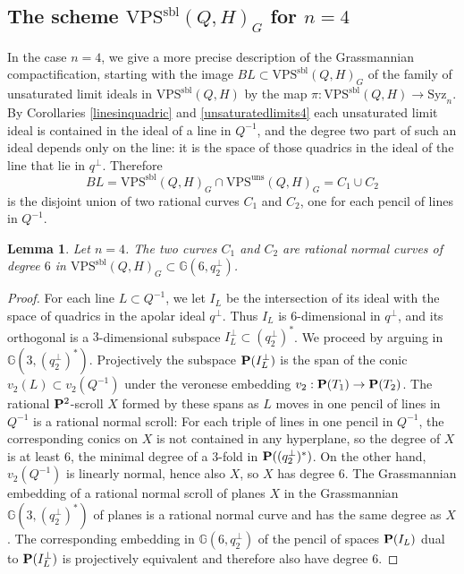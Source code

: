 \documentclass{amsart}
\newcommand{\PP}{{\bf P}}
\def\Gr #1#2{{\mathbb G}\left(#1,#2\right)} %
\newcommand{\VPSsbl}{{\mathrm{VPS}}^{\mathrm{sbl}}(Q, H)}
\newcommand{\VPSuns}{{\mathrm{VPS}}^{\mathrm{uns}}(Q, H)}
\newcommand{\Syz}{\mathrm{Syz}_n}%
\newtheorem{lemma}{\bf Lemma}[section]
\begin{document}
\subsection{The scheme $\VPSsbl_G$ for $n=4$}
In the case $n=4$, we give a more precise description of the Grassmannian
compactification, starting with the image $BL\subset \VPSsbl_G$
of the family of unsaturated limit ideals in $\VPSsbl$ by the map
$\pi:\VPSsbl\to \Syz$. By Corollaries \ref{linesinquadric} and
\ref{unsaturatedlimits4} each unsaturated limit ideal is contained in the
ideal of a line in $Q^{-1}$, and the degree two part of such an ideal depends
only on the line: it is the space of those quadrics in the ideal of the line that lie in $q^\perp$. Therefore $$BL=\VPSsbl_G\cap\VPSuns_G=C_1\cup C_2$$ is the disjoint union of two rational curves $C_1$ and $C_2$, one for each pencil of lines in $Q^{-1}$.

\begin{lemma}\label{degree6lem} Let $n=4$. The two curves $C_1$ and $C_2$ are rational normal curves of degree $6$ in 
$\VPSsbl_G\subset \Gr{6}{q^\perp_2}$.
\end{lemma}
\begin{proof} For each line $L\subset Q^{-1}$, we let $I_L$ be the intersection of its ideal with the space of quadrics in the apolar ideal $q^\perp$.  
Thus $I_L$ is $6$-dimensional in $q^\perp$, and its orthogonal is a $3$-dimensional subspace $I_L^\perp\subset (q^\perp_2)^*$.
We proceed by arguing in $\Gr{3}{(q^\perp_2)^*}$.  Projectively  the subspace $\PP(I_L^\perp)$ is the span of the conic  $v_2(L)\subset v_2(Q^{-1})$ under the veronese embedding $v_2: \PP(T_1)\to \PP(T_2)$. The rational $\PP^2$-scroll $X$ formed by these spans as $L$ moves in one pencil of lines in $Q^{-1}$ is a rational normal scroll: For each triple of lines in one pencil in $Q^{-1}$, the corresponding conics on $X$ is not contained in any hyperplane, so the degree of $X$ is at least $6$, the minimal degree of a $3$-fold in $\PP((q^\perp_2)^*)$.  On the other hand, $v_2(Q^{-1})$ is linearly normal, hence also $X$, so $X$ has degree $6$.  The Grassmannian embedding of a rational normal scroll of planes $X$ in the Grassmannian $\Gr{3}{(q^\perp_2)^*}$ of planes is a rational normal curve and has the same degree as $X$.  The corresponding embedding in $\Gr{6}{q^\perp_2}$ of the  pencil of spaces $\PP(I_L)$ dual to $\PP(I_L^\perp)$ is projectively equivalent and therefore also have degree $6$.
\end{proof}
\end{document}
